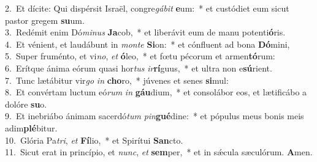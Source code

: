 {2.~}Et dícite: Qui dispérsit Israël, congre\textit{gá}\textit{bit} \textbf{e}um:~* et custódiet eum sicut pastor gregem \textbf{su}um.\\
{3.~}Redémit enim Dó\textit{mi}\textit{nus} \textbf{Ja}cob,~* et liberávit eum de manu potenti\textbf{ó}ris.\\
{4.~}Et vénient, et laudábunt in \textit{mon}\textit{te} \textbf{Si}on:~* et cónfluent ad bona \textbf{Dó}mini,\\
{5.~}Super fruménto, et vi\textit{no}, \textit{et} \textbf{ó}leo,~* et fœtu pécorum et armen\textbf{tó}rum:\\
{6.~}Erítque ánima eórum quasi hor\textit{tus} \textit{ir}\textbf{rí}guus,~* et ultra non e\textbf{sú}rient.\\
{7.~}Tunc lætábitur vir\textit{go} \textit{in} \textbf{cho}ro,~* júvenes et senes \textbf{si}mul:\\
{8.~}Et convértam luctum eó\textit{rum} \textit{in} \textbf{gáu}dium,~* et consolábor eos, et lætificábo a dolóre \textbf{su}o.\\
{9.~}Et inebriábo ánimam sacerdó\textit{tum} \textit{pin}\textbf{gué}dine:~* et pópulus meus bonis meis adim\textbf{plé}bitur.\\
{10.~}Glória Pa\textit{tri}, \textit{et} \textbf{Fí}lio,~* et Spirítui \textbf{San}cto.\\
{11.~}Sicut erat in princípio, et \textit{nunc}, \textit{et} \textbf{sem}per,~* et in sǽcula sæculórum. \textbf{A}men.\\
